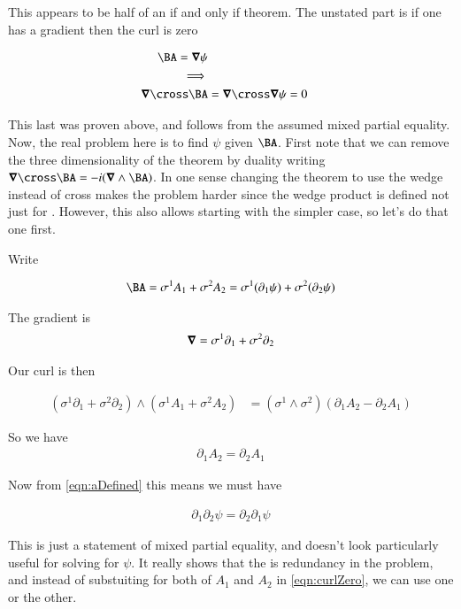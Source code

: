 \documentclass{article}
\begin{document}
This appears to be half of an if and only if theorem.  The unstated part is if one has a gradient then the curl is zero

\begin{align*}
\BA = \spacegrad \psi \\
\implies \\
\spacegrad \cross \BA &= \spacegrad \cross \spacegrad \psi = 0
\end{align*}

This last was proven above, and follows from the assumed mixed partial equality.  Now, the real problem here is to find $\psi$ given $\BA$.
First note that we can remove the three dimensionality of the theorem by duality writing $\spacegrad \cross \BA = -i (\spacegrad \wedge \BA)$.
In one sense changing the theorem to use the wedge instead of cross makes the problem harder since the wedge product is defined not just
for .  However, this also allows starting with the simpler  case, so let's do that one first.

Write

\begin{align}\label{eqn:aDefined}
\BA = \sigma^1 A_1 + \sigma^2 A_2 = \sigma^1 (\partial_1 \psi) + \sigma^2 (\partial_2 \psi)
\end{align}

The gradient is
\begin{align*}
\boldsymbol{\nabla} = \sigma^1 \partial_1 + \sigma^2 \partial_2
\end{align*}

Our curl is then

\begin{align*}
(\sigma^1 \partial_1 + \sigma^2 \partial_2) \wedge (\sigma^1 A_1 + \sigma^2 A_2) 
&=
(\sigma^1 \wedge \sigma^2) (\partial_1 A_2 - \partial_2 A_1)
\end{align*}

So we have
\begin{align}\label{eqn:curlZero}
\partial_1 A_2 = \partial_2 A_1
\end{align}

Now from \ref{eqn:aDefined} this means we must have

\begin{align}
\partial_1 \partial_2 \psi = \partial_2 \partial_1 \psi
\end{align}

This is just a statement of mixed partial equality, and doesn't look particularly useful for solving for $\psi$.  It really shows that the
is redundancy in the problem, and instead of substuiting for both of $A_1$ and $A_2$
in \ref{eqn:curlZero}, we can use one or the other.
\end{document}
